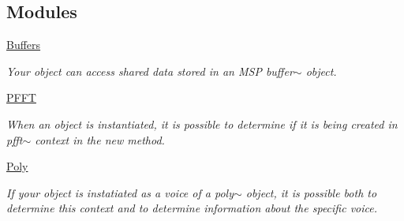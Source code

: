\subsection*{Modules}
\begin{DoxyCompactItemize}
\item 
\hyperlink{group__buffers}{Buffers}


\begin{DoxyCompactList}\small\item\em Your object can access shared data stored in an MSP buffer$\sim$ object. \item\end{DoxyCompactList}\item 
\hyperlink{group__pfft}{PFFT}


\begin{DoxyCompactList}\small\item\em When an object is instantiated, it is possible to determine if it is being created in pfft$\sim$ context in the new method. \item\end{DoxyCompactList}\item 
\hyperlink{group__poly}{Poly}


\begin{DoxyCompactList}\small\item\em If your object is instatiated as a voice of a poly$\sim$ object, it is possible both to determine this context and to determine information about the specific voice. \item\end{DoxyCompactList}\end{DoxyCompactItemize}
